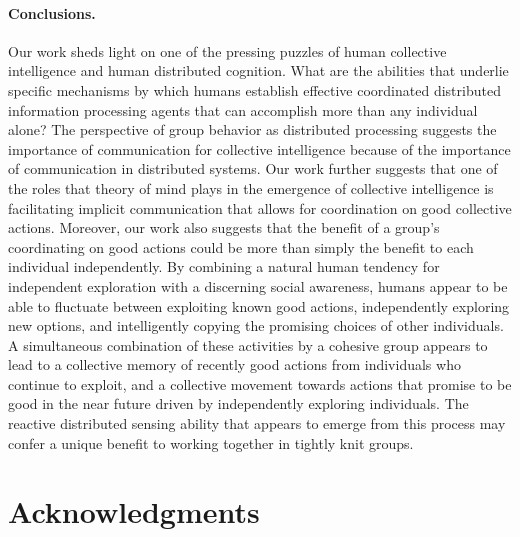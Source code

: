 \documentclass[12pt,letterpaper]{article}
\begin{document}
\paragraph{Conclusions.}
Our work sheds light on one of the pressing puzzles of
human collective intelligence and human distributed cognition.  What
are the abilities that underlie specific mechanisms by which humans establish effective
coordinated distributed information processing agents that can
accomplish more than any individual alone?  The perspective of group behavior as
distributed processing \cite{hutchins_cognition_1995} suggests the
importance of communication for collective intelligence because of the
importance of communication in distributed systems.  
Our work further
suggests that one of the roles that theory of mind plays in the
emergence of collective intelligence is facilitating implicit
communication that allows for coordination on good collective actions.
Moreover, our work also suggests that the benefit of a group's
coordinating on good actions could be more than simply the benefit to
each individual independently.  By combining a natural human tendency
for independent exploration with a discerning social awareness, humans
appear to be able to fluctuate between exploiting known good actions,
independently exploring new options, and intelligently copying the
promising choices of other individuals.  A simultaneous combination of
these activities by a cohesive group appears to lead to a collective
memory of recently good actions from individuals who continue to
exploit, and a collective movement towards actions that promise to be
good in the near future driven by independently exploring individuals.
The reactive distributed sensing ability that appears to emerge from
this process may confer a unique benefit to working together in
tightly knit groups.

\section{Acknowledgments}
\end{document}
